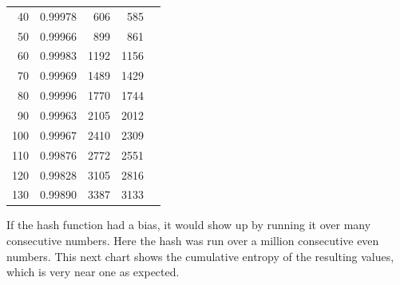 \documentclass[letterpaper]{article}
\begin{document}
\begin{multicols}{2}
\begin{center}
\begin{tabular}{|r|r|r|r|c|}
40 & 0.99978 & 606 & 585 & \\
50 & 0.99966 & 899 & 861 & \\
60 & 0.99983 & 1192 & 1156 & \\
70 & 0.99969 & 1489 & 1429 & \\
80 & 0.99996 & 1770 & 1744 & \\
90 & 0.99963 & 2105 & 2012 & \\
100 & 0.99967 & 2410 & 2309 & \\
110 & 0.99876 & 2772 & 2551 & \\
120 & 0.99828 & 3105 & 2816 & \\
130 & 0.99890 & 3387 & 3133 & \\
\hline
\end{tabular}
\end{center}

If the hash function had a bias, it would show up by running it over many consecutive numbers. Here the hash was run over a million consecutive even numbers. This next chart shows the cumulative entropy of the resulting values, which is very near one as expected.


\end{multicols}
\end{document}

